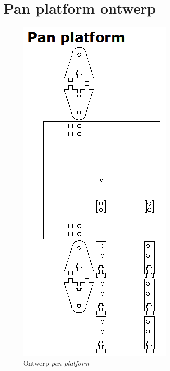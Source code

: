 \chapter{Pan platform ontwerp}
\label{app:pan-platform}

\begin{figure}
    \includegraphics[scale=0.5]{figures/appendix/pan.png}
    \caption{Ontwerp \emph{pan platform}}
\end{figure}
